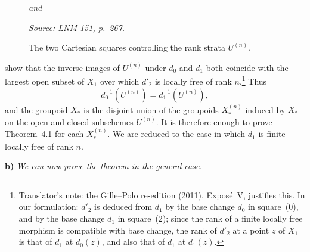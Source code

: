 \begin{figure}[H]
  \centering
  \qquad\textit{and}\qquad
  \caption{The two Cartesian squares controlling the rank strata
    \(U^{(n)}\).}
  \label{fig:sga3-exp5-p267-section5-rank-squares}
  \par\smallskip
  {\footnotesize\itshape Source: LNM 151, p.~267.}
\end{figure}

\noindent show that the inverse images of \(U^{(n)}\) under \(d_0\)
and \(d_1\) both coincide with the largest open subset of \(X_1\)
over which \(d'_2\) is locally free of rank \(n\).\footnote{Translator's note: the Gille--Polo re-edition (2011), Exposé~V, justifies
this. In our formulation: \(d'_2\) is deduced from \(d_1\) by the base change
\(d_0\) in square~(0), and by the base change \(d_1\) in square~(2); since the
rank of a finite locally free morphism is compatible with base change, the
rank of \(d'_2\) at a point \(z\) of \(X_1\) is that of \(d_1\) at \(d_0(z)\), and
also that of \(d_1\) at \(d_1(z)\).}
Thus
\[
  d_0^{-1}(U^{(n)})=d_1^{-1}(U^{(n)}),
\]
and the groupoid \(X_\ast\) is the disjoint union of the groupoids
\(X_\ast^{(n)}\) induced by \(X_\ast\) on the open-and-closed
subschemes \(U^{(n)}\). It is therefore enough to prove
\hyperref[thm:sga3-V-4.1]{Theorem~4.1} for each \(X_\ast^{(n)}\). We are reduced to the case in
which \(d_1\) is finite locally free of rank \(n\).

\medskip
{}\label{par:sga3-V-5-b}%
\noindent\textbf{b)}
\textit{We can now prove \hyperref[thm:sga3-V-4.1]{the theorem} in the general case.}
